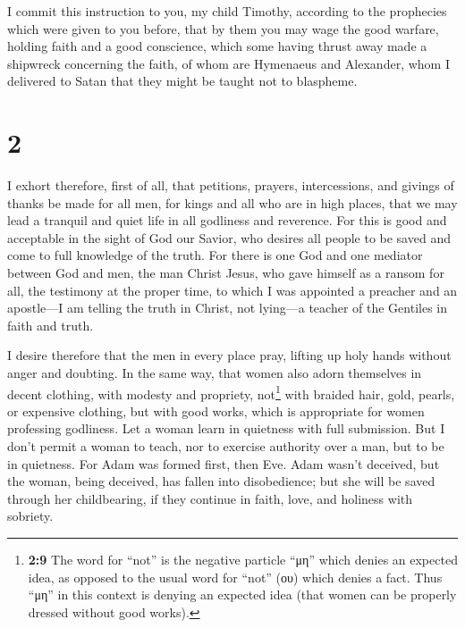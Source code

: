  I commit this instruction to you, my child Timothy,
according to the prophecies which were given to you before, that by them
you may wage the good warfare,  holding faith and a good
conscience, which some having thrust away made a shipwreck concerning
the faith,  of whom are Hymenaeus and Alexander, whom I
delivered to Satan that they might be taught not to blaspheme.

\hypertarget{section-1}{%
\section{2}\label{section-1}}

 I exhort therefore, first of all, that petitions,
prayers, intercessions, and givings of thanks be made for all men,
 for kings and all who are in high places, that we may
lead a tranquil and quiet life in all godliness and reverence.
 For this is good and acceptable in the sight of God our
Savior,  who desires all people to be saved and come to
full knowledge of the truth.  For there is one God and one
mediator between God and men, the man Christ Jesus,  who
gave himself as a ransom for all, the testimony at the proper time,
 to which I was appointed a preacher and an apostle---I am
telling the truth in Christ, not lying---a teacher of the Gentiles in
faith and truth.

 I desire therefore that the men in every place pray,
lifting up holy hands without anger and doubting.  In the
same way, that women also adorn themselves in decent clothing, with
modesty and propriety, not\footnote{\textbf{2:9} The word for ``not'' is
  the negative particle ``μη'' which denies an expected idea, as opposed
  to the usual word for ``not'' (ου) which denies a fact. Thus ``μη'' in
  this context is denying an expected idea (that women can be properly
  dressed without good works).} with braided hair, gold, pearls, or
expensive clothing,  but with good works, which is
appropriate for women professing godliness.  Let a woman
learn in quietness with full submission.  But I don't
permit a woman to teach, nor to exercise authority over a man, but to be
in quietness.  For Adam was formed first, then Eve.
 Adam wasn't deceived, but the woman, being deceived, has
fallen into disobedience;  but she will be saved through
her childbearing, if they continue in faith, love, and holiness with
sobriety.

